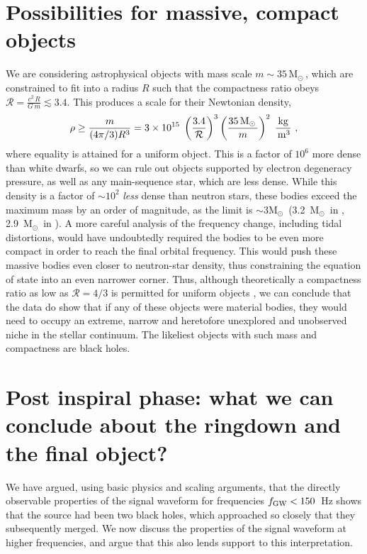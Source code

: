 \documentclass{andp2012}%
\newcommand{\inlinecite}[1]{\cite{#1}}
\newcommand{\inlinecites}[1]{\cite{#1}}
\def\fgw{f_{\rm GW}}
\newcommand{\Msun}{\ensuremath{\mathrm{M}_\odot\,}}
\newcommand{\MCOMPONENTAPPROX}{\ensuremath{35\, \Msun}}
\newcommand{\CHIRPFSTRAINPEAK}{\ensuremath{150}} %
\begin{document}
\section{Possibilities for massive, compact objects}
\label{Sec:stability}
We are considering astrophysical objects with mass scale
$m \sim \MCOMPONENTAPPROX$, which are constrained to
fit into a radius $R $ such that the compactness ratio
obeys $\mathcal{R} = \frac{c^2 \, R}{G\,m}\lesssim 3.4$.
This produces a scale for their Newtonian density,
\begin{equation}
\label{density}
\rho \geq \frac{m}{(4\pi/3) R^3 } = 3 \times 10^{15} \; 
\left (\frac{3.4}{\mathcal{R}}\right )^3 
\left ( \frac{\MCOMPONENTAPPROX}{m} \right )^2 \; \frac{\rm kg}{{\, \rm m}^3} ~,
\end{equation}
where equality is attained for a uniform object.
This is a factor of $10^6$ more dense than white dwarfs, so we
can rule out objects supported by electron degeneracy pressure,
as well as any main-sequence star, which are less dense.
While this density is a factor of $\sim10^2$ {\it less} dense than neutron stars,
these bodies exceed the maximum \NS mass by
an order of magnitude,
as the \NS limit is
$\sim3\Msun\!\!$ (3.2~$\Msun\!\!$ in \inlinecites{Rhoades:1974fn,Hannam:2013uu},
2.9~$\Msun\!\!$ in \inlinecite{Kalogera:1996ci}).
A more careful analysis of the frequency change, including tidal
distortions, would have undoubtedly required the bodies to be
even more compact in order to reach the final orbital frequency.
This would push these massive bodies even closer to neutron-star
density, thus constraining  the equation of state into an even
narrower corner.
Thus, although theoretically a compactness ratio as low as $\mathcal{R}=4/3$
is permitted for uniform objects \cite{doi:10.1146/annurev-nucl-102711-095018},
we can conclude that the data do show that if any of these objects were material bodies,
they would need to occupy an extreme, narrow and heretofore unexplored and
unobserved niche in the stellar continuum.
The likeliest objects with such mass and compactness are black holes.


\section{Post inspiral phase: what we can conclude about the ringdown and the final object?}
\label{Sec:ringdown}

We have argued, using basic physics and scaling arguments, that the
directly observable properties of the signal waveform for \GW
frequencies $\fgw< \CHIRPFSTRAINPEAK$~Hz shows that the source had been
two black holes, which approached so closely that they subsequently merged.
We now discuss the properties of the signal waveform at higher frequencies,
and argue that this also lends support to this interpretation.
\end{document}
